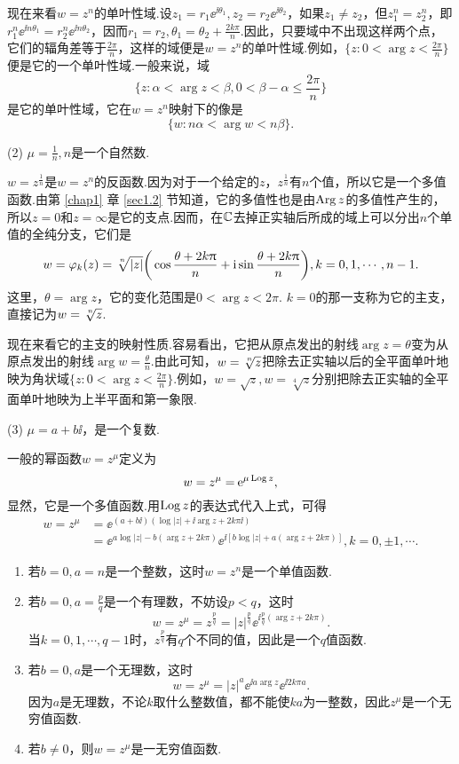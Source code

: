 现在来看$w=z^n$的单叶性域.设$z_1=r_1\ee^{\ii\theta_1},z_2=r_2\ee^{\ii\theta_2}$，如果$z_1\ne z_2$，但$z_1^n=z_2^n$，即$r_1^n\ee^{\ii n\theta_1}=r_2^n\ee^{\ii n\theta_2}$，因而$r_1=r_2,\theta_1=\theta_2+\frac{2k\pi}n$.因此，只要域中不出现这样两个点，它们的辐角差等于$\frac{2\pi}n$，这样的域便是$w=z^n$的单叶性域.例如，$\bigg\{z:0<\arg z<\frac{2\pi}n\bigg\}$便是它的一个单叶性域.一般来说，域
\[
  \bigg\{ z:\alpha < \arg z < \beta, 0 < \beta - \alpha \le \frac{2\pi}n \bigg\}
\]
是它的单叶性域，它在$w=z^n$映射下的像是
\[
  \{w:n\alpha < \arg w < n\beta\}.
\]

(2) $\mu=\frac1n,n${\kaishu 是一个自然数.}

$w=z^{\frac1n}$是$w=z^n$的反函数.因为对于一个给定的$z$，$z^{\frac1n}$有$n$个值，所以它是一个多值函数.由第 \ref{chap1} 章 \ref{sec1.2} 节知道，它的多值性也是由$\operatorname{Arg} z$的多值性产生的，所以$z=0$和$z=\infty$是它的支点.因而，在$\mathbb C$去掉正实轴后所成的域上可以分出$n$个单值的全纯分支，它们是
\[
  w = \varphi_k(z) = \sqrt[\leftroot{-1}\uproot{2} n]{|z|}\bigg(\cos\frac{\theta+2k\pi}n +
  \ii\sin\frac{\theta+2k\pi}n\bigg), k = 0,1,\cdots,n-1.
\]
这里，$\theta=\arg z$，它的变化范围是$0<\arg z<2\pi$. $k=0$的那一支称为它的主支，直接记为$w=\sqrt[\leftroot{-1}\uproot{2} n]z$.

现在来看它的主支的映射性质.容易看出，它把从原点发出的射线$\arg z=\theta$变为从原点发出的射线$\arg w=\frac\theta n$.由此可知，$w=\sqrt[\leftroot{-1}\uproot{2} n]z$把除去正实轴以后的全平面单叶地映为角状域$\bigg\{z:0<\arg z<\frac{2\pi}n\bigg\}$.例如，$w=\sqrt z,w=\sqrt[4]z$分别把除去正实轴的全平面单叶地映为上半平面和第一象限.

(3) $\mu=a+b\ii$，{\kaishu 是一个复数.}

一般的幂函数$w=z^\mu$定义为
\[
  w = z^\mu = \operatorname{\!\!\;\mathrm e}^{\mu\operatorname{Log} z},
\]
显然，它是一个多值函数.用$\operatorname{Log} z$的表达式代入上式，可得
\begin{align*}
  w = z^\mu & = \ee^{(a+b\ii)(\log|z| + \ii\arg z + 2k\pi \ii)}\\
  & = \ee^{a\log|z| - b(\arg z + 2k\pi)}\ee^{\ii[b\log|z| + a(\arg z + 2k\pi)]},k  = 0,\pm1,\cdots.
\end{align*}
\begin{enumerate}[label=(\alph*),left=0.85cm]
  \item \label{2.5.3.1} 若$b=0,a=n$是一个整数，这时$w=z^n$是一个单值函数.
  \item \label{2.5.3.2} 若$b=0,a=\frac pq$是一个有理数，不妨设$p<q$，这时
      \[
        w = z^\mu = z^{\frac pq} = |z|^{\frac pq}\ee^{\ii\frac pq(\arg z + 2k\pi)}.
      \]
      当$k=0,1,\cdots,q-1$时，$z^{\frac pq}$有$q$个不同的值，因此是一个$q$值函数.
  \item \label{2.5.3.3} 若$b=0,a$是一个无理数，这时
      \[
        w = z^\mu = |z|^a\ee^{\ii a\arg z} \ee^{\ii2k\pi a}.
      \]
      因为$a$是无理数，不论$k$取什么整数值，都不能使$ka$为一整数，因此$z^\mu$是一个无穷值函数.
  \item \label{2.5.3.4} 若$b\ne0$，则$w=z^\mu$是一无穷值函数.
\end{enumerate}

